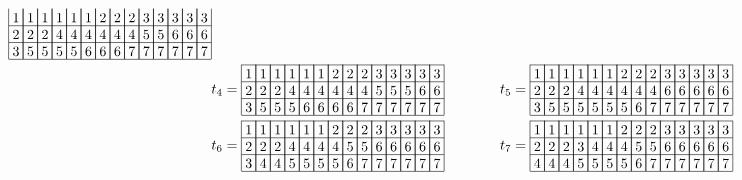 \begin{align*}
\begin{array}[c]{*{14}c}
\lr{1}&\lr{1}&\lr{1}&\lr{1}&\lr{1}&\lr{1}&\lr{2}&\lr{2}&\lr{2}&\lr{3}&\lr{3}&\lr{3}&\lr{3}&\lr{3}\\\cline{1-14}
\lr{2}&\lr{2}&\lr{2}&\lr{4}&\lr{4}&\lr{4}&\lr{4}&\lr{4}&\lr{4}&\lr{5}&\lr{5}&\lr{6}&\lr{6}&\lr{6}\\\cline{1-14}
\lr{3}&\lr{5}&\lr{5}&\lr{5}&\lr{5}&\lr{6}&\lr{6}&\lr{6}&\lr{7}&\lr{7}&\lr{7}&\lr{7}&\lr{7}&\lr{7}\\\cline{1-14}
\end{array}\\
    &t_4 = \begin{array}[c]{*{14}c}\cline{1-14}
\lr{1}&\lr{1}&\lr{1}&\lr{1}&\lr{1}&\lr{1}&\lr{2}&\lr{2}&\lr{2}&\lr{3}&\lr{3}&\lr{3}&\lr{3}&\lr{3}\\\cline{1-14}
\lr{2}&\lr{2}&\lr{2}&\lr{4}&\lr{4}&\lr{4}&\lr{4}&\lr{4}&\lr{4}&\lr{5}&\lr{5}&\lr{5}&\lr{6}&\lr{6}\\\cline{1-14}
\lr{3}&\lr{5}&\lr{5}&\lr{5}&\lr{6}&\lr{6}&\lr{6}&\lr{6}&\lr{7}&\lr{7}&\lr{7}&\lr{7}&\lr{7}&\lr{7}\\\cline{1-14}
\end{array}\hspace{30pt}
    &t_5 = \begin{array}[c]{*{14}c}\cline{1-14}
\lr{1}&\lr{1}&\lr{1}&\lr{1}&\lr{1}&\lr{1}&\lr{2}&\lr{2}&\lr{2}&\lr{3}&\lr{3}&\lr{3}&\lr{3}&\lr{3}\\\cline{1-14}
\lr{2}&\lr{2}&\lr{2}&\lr{4}&\lr{4}&\lr{4}&\lr{4}&\lr{4}&\lr{4}&\lr{6}&\lr{6}&\lr{6}&\lr{6}&\lr{6}\\\cline{1-14}
\lr{3}&\lr{5}&\lr{5}&\lr{5}&\lr{5}&\lr{5}&\lr{5}&\lr{6}&\lr{7}&\lr{7}&\lr{7}&\lr{7}&\lr{7}&\lr{7}\\\cline{1-14}
\end{array}\\
    &t_6 = \begin{array}[c]{*{14}c}\cline{1-14}
\lr{1}&\lr{1}&\lr{1}&\lr{1}&\lr{1}&\lr{1}&\lr{2}&\lr{2}&\lr{2}&\lr{3}&\lr{3}&\lr{3}&\lr{3}&\lr{3}\\\cline{1-14}
\lr{2}&\lr{2}&\lr{2}&\lr{4}&\lr{4}&\lr{4}&\lr{4}&\lr{5}&\lr{5}&\lr{6}&\lr{6}&\lr{6}&\lr{6}&\lr{6}\\\cline{1-14}
\lr{3}&\lr{4}&\lr{4}&\lr{5}&\lr{5}&\lr{5}&\lr{5}&\lr{6}&\lr{7}&\lr{7}&\lr{7}&\lr{7}&\lr{7}&\lr{7}\\\cline{1-14}
\end{array}\hspace{30pt}
    &t_7 = \begin{array}[c]{*{14}c}\cline{1-14}
\lr{1}&\lr{1}&\lr{1}&\lr{1}&\lr{1}&\lr{1}&\lr{2}&\lr{2}&\lr{2}&\lr{3}&\lr{3}&\lr{3}&\lr{3}&\lr{3}\\\cline{1-14}
\lr{2}&\lr{2}&\lr{2}&\lr{3}&\lr{4}&\lr{4}&\lr{4}&\lr{5}&\lr{5}&\lr{6}&\lr{6}&\lr{6}&\lr{6}&\lr{6}\\\cline{1-14}
\lr{4}&\lr{4}&\lr{4}&\lr{5}&\lr{5}&\lr{5}&\lr{5}&\lr{6}&\lr{7}&\lr{7}&\lr{7}&\lr{7}&\lr{7}&\lr{7}\\\cline{1-14}
\end{array}
\end{align*}

